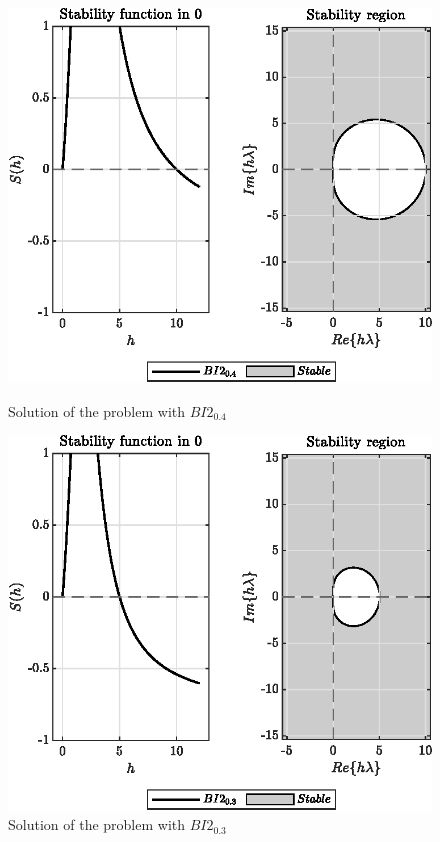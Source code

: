 \documentclass[11pt,a4paper,oneside]{article}
\begin{document}
\begin{figure}[htb]
    \centering
    \begin{minipage}{0.45\textwidth}
        \centering
        \includegraphics*[width=\textwidth, keepaspectratio]{ex5_BI2_0.4.eps}
        \caption[]{\label{fig:ex5_BI2-04} Solution of the problem with $BI2_{0.4}$}
    \end{minipage}
    \hspace{0.05\textwidth}
    \begin{minipage}{0.45\textwidth}
        \centering
        \includegraphics*[width=\textwidth, keepaspectratio]{ex5_BI2_0.3.eps}
        \caption[]{\label{fig:ex5_BI2-03} Solution of the problem with $BI2_{0.3}$}
    \end{minipage}
\end{figure}
\end{document}
